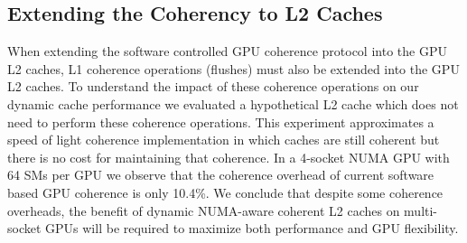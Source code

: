 \subsection{Extending the Coherency to L2 Caches}
When extending the software controlled GPU coherence protocol into the GPU L2 
caches, L1 coherence operations (flushes) must also be extended into the GPU 
L2 caches.  To understand the impact of these coherence operations on our 
dynamic cache performance we evaluated a hypothetical L2 cache which does not 
need to perform these coherence operations.  This experiment approximates a 
speed of light coherence implementation in which caches are still coherent 
but there is no cost for maintaining that coherence. In a 4-socket NUMA GPU 
with 64 SMs per GPU we observe that the coherence overhead of current 
software based GPU coherence is only 10.4\%. We conclude that despite some 
coherence overheads, the benefit of dynamic NUMA-aware coherent L2 caches on 
multi-socket GPUs will be required to maximize both performance and GPU 
flexibility. 


